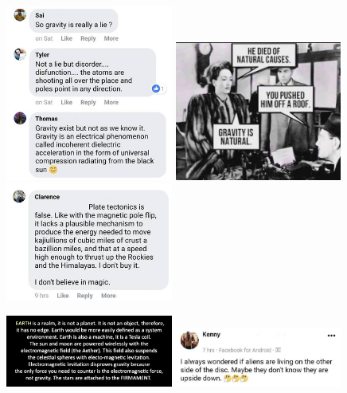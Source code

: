 \includegraphics[width=5.5cm]{images/gravity_stupid/stupid7}
\includegraphics[width=5.5cm]{images/gravity_stupid/stupid5}
\includegraphics[width=5.5cm]{images/gravity_stupid/stupid6}

\includegraphics[width=5.5cm]{images/gravity_stupid/stupid3}
\includegraphics[width=5.5cm]{images/gravity_stupid/stupid8}

